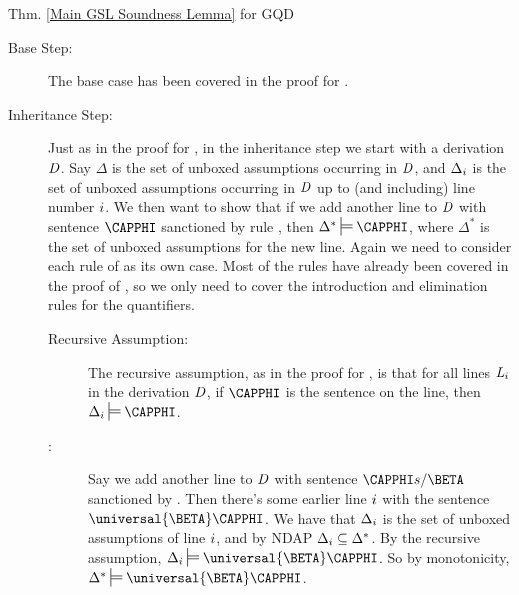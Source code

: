 \begin{PROOFOF}{Thm. \ref{Main GSL Soundness Lemma} for GQD}
\begin{description}

\item[Base Step:] 
The base case has been covered in the proof for \GSD{}. 

\item[Inheritance Step:] 
Just as in the proof for \GSD{}, in the inheritance step we start with a derivation $\mathit{D}$.
Say $\Delta$ is the set of unboxed assumptions occurring in $\mathit{D}$, and $\Delta_i$ is the set of unboxed assumptions occurring in $\mathit{D}$ up to (and including) line number $i$. 
We then want to show that if we add another line to $\mathit{D}$ with sentence $\CAPPHI$ sanctioned by rule , then $\Delta^*\sdtstile{}{}\CAPPHI$, where $\Delta^*$ is the set of unboxed assumptions for the new line. %
Again we need to consider each rule  of \GQD{} as its own case.
Most of the rules have already been covered in the proof of \GSD{}, so we only need to cover the introduction and elimination rules for the quantifiers. 

\begin{description}

\item[Recursive Assumption:]  
The recursive assumption, as in the proof for \GSD{}, is that for all lines $\mathit{L}_i$ in the derivation $\mathit{D}$, if $\CAPPHI$ is the sentence on the line, then $\Delta_{\integer{i}}\sdtstile{}{}\CAPPHI$. 

\item[:]
Say we add another line to $\mathit{D}$ with sentence $\CAPPHI\variable{s}/\BETA$ sanctioned by .
Then there's some earlier line $i$ with the sentence $\universal{\BETA}\CAPPHI$. 
We have that $\Delta_{i}$ is the set of unboxed assumptions of line $i$, and by NDAP $\Delta_{i}\subseteq\Delta^*$.
By the recursive assumption, $\Delta_{\integer{i}}\sdtstile{}{}\universal{\BETA}\CAPPHI$.
So by monotonicity, $\Delta^*\sdtstile{}{}\universal{\BETA}\CAPPHI$.


\end{description}
\end{description}
\end{PROOFOF}

